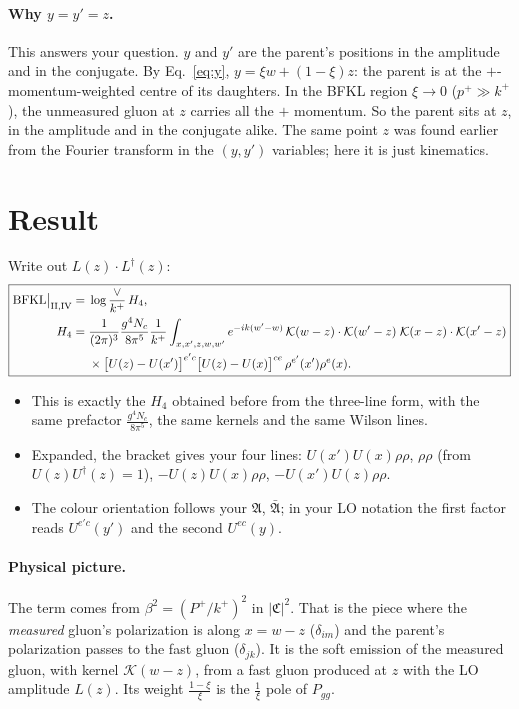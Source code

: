 \documentclass[10pt]{article}
\numberwithin{equation}{section}
\newcommand{\mf}[1]{\mathfrak{#1}}
\begin{document}
\paragraph{Why $y=y'=z$.} This answers your question. $y$ and $y'$ are the parent's positions in the amplitude and in the conjugate. By Eq.~\eqref{eq:y}, $y=\xi w+(1-\xi)z$: the parent is at the $+$-momentum-weighted centre of its daughters. In the BFKL region $\xi\to0$ ($p^+\gg k^+$), the unmeasured gluon at $z$ carries all the $+$ momentum. So the parent sits at $z$, in the amplitude and in the conjugate alike. The same point $z$ was found earlier from the Fourier transform in the $(y,y')$ variables; here it is just kinematics.

\section{Result}
Write out $L(z)\cdot L^\dagger(z)$:
\begin{equation}
\boxed{\begin{aligned}
\text{BFKL}\big|_{\rm II,IV}={}&\log\frac{\vee}{k^+}\,H_4,\\
H_4={}&\frac{1}{(2\pi)^{3}}\frac{g^{4}N_c}{8\pi^{5}}\frac{1}{k^{+}}\int_{x,x',z,w,w'}e^{-ik(w'-w)}\,\mathcal K(w-z)\cdot\mathcal K(w'-z)\;\mathcal K(x-z)\cdot\mathcal K(x'-z)\\
&\times\big[U(z)-U(x')\big]^{e'c}\big[U(z)-U(x)\big]^{ce}\,\rho^{e'}(x')\rho^{e}(x).
\end{aligned}}
\end{equation}
\begin{itemize}
\item This is exactly the $H_4$ obtained before from the three-line form, with the same prefactor $\frac{g^4N_c}{8\pi^5}$, the same kernels and the same Wilson lines.
\item Expanded, the bracket gives your four lines: $U(x')U(x)\rho\rho$, $\rho\rho$ (from $U(z)U^\dagger(z)=1$), $-U(z)U(x)\rho\rho$, $-U(x')U(z)\rho\rho$.
\item The colour orientation follows your $\mf A$, $\bar{\mf A}$; in your LO notation the first factor reads $U^{e'c}(y')$ and the second $U^{ec}(y)$.
\end{itemize}
\paragraph{Physical picture.} The term comes from $\beta^2=(P^+/k^+)^2$ in $|\mf C|^2$. That is the piece where the \emph{measured} gluon's polarization is along $x=w-z$ ($\delta_{im}$) and the parent's polarization passes to the fast gluon ($\delta_{jk}$). It is the soft emission of the measured gluon, with kernel $\mathcal K(w-z)$, from a fast gluon produced at $z$ with the LO amplitude $L(z)$. Its weight $\frac{1-\xi}{\xi}$ is the $\frac1\xi$ pole of $P_{gg}$.
\end{document}

